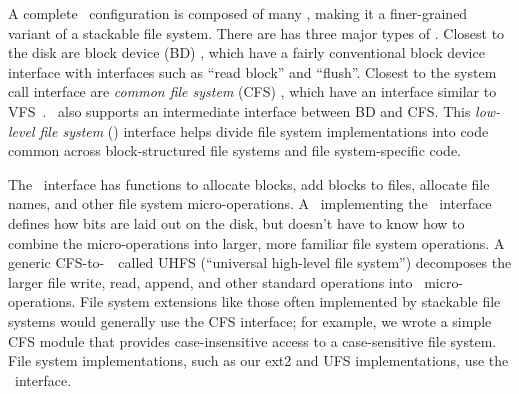 
\label{sec:modules:interfaces}

\begin{comment}
New \modules\ are
simple to write, and by changing the \module\ arrangement, a broad range of
behaviors can be implemented. It's also easy to tell what behavior a given
arrangement will give just by looking at the connections between the \modules.
\end{comment}

A complete \Kudos\ configuration is composed of many \modules, making it
a finer-grained variant of a stackable file system.
%
There are has three major types of \modules.
%
Closest to the disk are block device (BD) \modules, which have a fairly
conventional block device interface with interfaces such as ``read block'' and
``flush''. 
%
Closest to the system call interface are \emph{common file system} (CFS)
\modules, which have an interface similar to VFS~\cite{kleiman86vnodes}. 
%
\Kudos\ also supports an intermediate interface between BD and CFS.
%
This \emph{low-level file system} (\LFS) interface helps divide file system
implementations into code common across block-structured file systems and
file system-specific code.
%
\begin{comment}
A
\Kudos\ file system designer combines modules with all three interfaces in many
ways -- a departure from stackable file systems, which act only at the VFS/CFS
layer. \Kudos\ \modules\ are implemented in C using structures of function
pointers to achieve object oriented behavior, very much like the rest of the
Linux kernel.
\end{comment}
%
The \LFS\ interface has functions to allocate blocks, add blocks to files,
allocate file names, and other file system micro-operations. A \module\
implementing the \LFS\ interface defines how bits are laid out on the disk, but
doesn't have to know how to combine the micro-operations into larger, more
familiar file system operations. A generic CFS-to-\LFS\ \module\ called UHFS
(``universal high-level file system'') decomposes the larger file write, read,
append, and other standard operations into \LFS\ micro-operations. 
%
File system extensions like those often implemented by stackable file
systems would generally use the CFS interface; for example, we wrote a
simple CFS module that provides case-insensitive access to a case-sensitive
file system.
%
File system implementations, such as our ext2 and UFS implementations, use
the \LFS\ interface.


